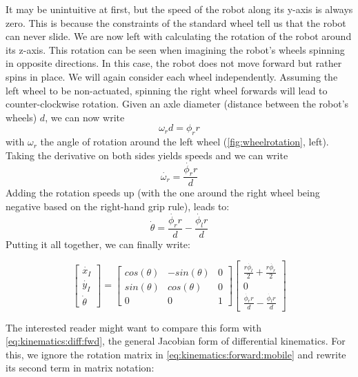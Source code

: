 It may be unintuitive at first, but the speed of the robot along its y-axis is always zero. This is because the constraints of the standard wheel tell us that the robot can never slide.
We are now left with calculating the rotation of the robot around its z-axis. This rotation can be seen when imagining the robot's wheels spinning in opposite directions. In this case, the robot does not move forward but rather spins in place.
We will again consider each wheel independently. Assuming the left wheel to be non-actuated, spinning the right wheel forwards will lead to counter-clockwise rotation. Given an axle diameter (distance between the robot's wheels) $d$, we can now write
\begin{equation}
\omega_r d = \phi_r r
\end{equation}
with $\omega_r$ the angle of rotation around the left wheel (\cref{fig:wheelrotation}, left). Taking the derivative on both sides yields speeds and we can write
\begin{equation}
\dot{\omega_r} = \frac{\dot{\phi_r} r}{d}
\end{equation}
Adding the rotation speeds up (with the one around the right wheel being negative based on the right-hand grip rule), leads to:
%
\begin{equation}
\dot{\theta}=\frac{\dot{\phi_r} r}{d}-\frac{\dot{\phi_l} r}{d}
\end{equation}
%
Putting it all together, we can finally write:

\begin{equation}\label{eq:kinematics:forward:mobile}
\left[\begin{array}{c} \dot{x_I}\\\dot{y_I}\\\dot{\theta}\end{array}\right]=\left[\begin{array}{ccc}
cos(\theta) & -sin(\theta) & 0 \\
sin(\theta) & cos(\theta) & 0 \\
0 & 0 & 1\end{array}\right]\left[\begin{array}{c}\frac{r\dot{\phi_l}}{2}+\frac{r\dot{\phi_r}}{2}\\0\\\frac{\dot{\phi_r} r}{d}-\frac{\dot{\phi_l} r}{d}\end{array}\right]
\end{equation}

The interested reader might want to compare this form with \cref{eq:kinematics:diff:fwd}, the general Jacobian form of differential kinematics. For this, we ignore the rotation matrix in \cref{eq:kinematics:forward:mobile} and rewrite its second term in matrix notation:

